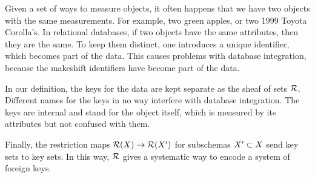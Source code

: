 \documentclass{amsart}
\begin{document}
\begin{remark}\label{rem:internal keys}

Given a set of ways to measure objects, it often happens that we have two objects with the same measurements.  For example, two green apples, or two 1999 Toyota Corolla's.  In relational databases, if two objects have the same attributes, then they are the same.  To keep them distinct, one introduces a unique identifier, which becomes part of the data.  This causes problems with database integration, because the makeshift identifiers have become part of the data.

In our definition, the keys for the data are kept separate as the sheaf of sets $\mcR$.  Different names for the keys in no way interfere with database integration.  The keys are internal and stand for the object itself, which is measured by its attributes but not confused with them.

Finally, the restriction maps $\mcR(X)\to\mcR(X')$ for subschemas $X'\ss X$ send key sets to key sets.  In this way, $\mcR$ gives a systematic way to encode a system of foreign keys.

\end{remark}
\end{document}
